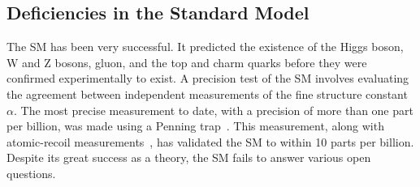 \subsection{Deficiencies in the Standard Model}
The SM has been very successful. It predicted the existence of the Higgs boson,
W and Z bosons, gluon, and the top and charm quarks before they were confirmed
experimentally to exist. A precision test of the SM involves evaluating the
agreement between independent measurements of the fine structure constant
$\alpha$. The most precise measurement to date, with a precision of more than
one part per billion, was made using a Penning
trap~\cite{PhysRevLett.100.120801}. This measurement, along with atomic-recoil
measurements~\cite{PhysRevLett.96.033001}, has validated the SM to within 10
parts per billion. Despite its great success as a theory, the SM fails to answer
various open questions.

